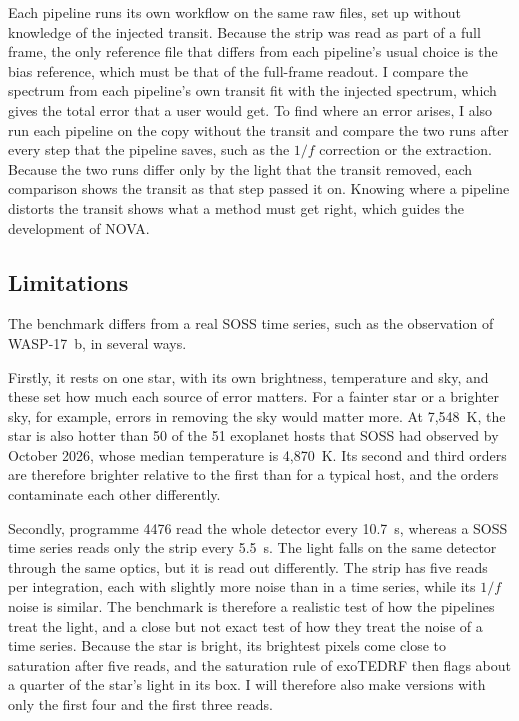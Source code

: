 Each pipeline runs its own workflow on the same raw files, set up without
knowledge of the injected transit. Because the strip was read as part of a
full frame, the only reference file that differs from each pipeline's usual
choice is the bias reference, which must be that of the full-frame readout. I
compare the spectrum from each pipeline's own transit fit with the injected
spectrum, which gives the total error that a user would get. To find where an
error arises, I also run each pipeline on the copy without the transit and
compare the two runs after every step that the pipeline saves, such as the
$1/f$ correction or the extraction. Because the two runs differ only by the light that the transit removed, each comparison shows the transit as that step passed it on. Knowing
where a pipeline distorts the transit shows what a method must get right,
which guides the development of NOVA.

\subsection{Limitations}
\label{sec:benchmark-limits}

The benchmark differs from a real SOSS time series, such as the observation of
WASP-17~b, in several ways.

Firstly, it rests on one star, with its own brightness, temperature and sky,
and these set how much each source of error matters. For a fainter star or a
brighter sky, for example, errors in removing the sky would matter more. At 7,548~K, the star is also hotter than 50 of the 51 exoplanet hosts that SOSS had observed by October 2026, whose median temperature is 4,870~K. Its second and third orders are therefore brighter relative to the first than for a typical host, and the orders contaminate each other differently.

Secondly, programme 4476 read the whole detector every 10.7~s, whereas a SOSS
time series reads only the strip every 5.5~s. The light falls on the same
detector through the same optics, but it is read out differently. The strip
has five reads per integration, each with slightly more noise than in a time
series, while its $1/f$ noise is similar. The benchmark is therefore a
realistic test of how the pipelines treat the light, and a close but not exact
test of how they treat the noise of a time series. Because the star is bright,
its brightest pixels come close to saturation after five reads, and the
saturation rule of exoTEDRF then flags about a quarter of the star's light in
its box. I will therefore also make versions with only the first four and the
first three reads.

